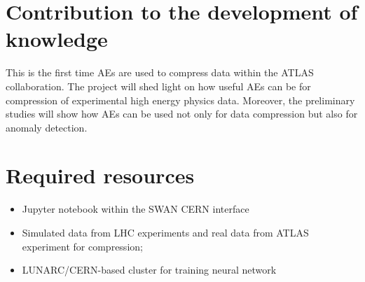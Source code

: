 \documentclass[11pt]{article}
\begin{document}
\section{Contribution to the development of knowledge}

This is the first time AEs are used to compress data within the ATLAS collaboration. The project will shed light on how useful AEs can be for compression of experimental high energy physics data. Moreover, the preliminary studies will show how AEs can be used not only for data compression but also for anomaly detection. 

\section{Required resources}

\begin{itemize}
    \item Jupyter notebook within the SWAN CERN interface
    \item Simulated data from LHC experiments 
    and real data from ATLAS experiment for compression;
    \item LUNARC/CERN-based cluster for training neural network
\end{itemize}






\end{document}
